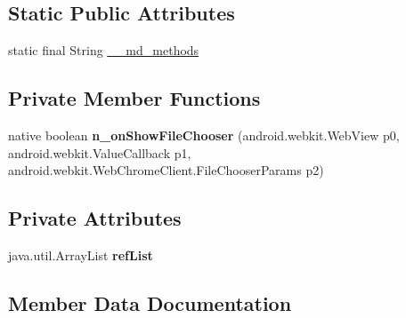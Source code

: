 \subsection*{Static Public Attributes}
\begin{DoxyCompactItemize}
\item 
static final String \hyperlink{classmd5b60ffeb829f638581ab2bb9b1a7f4f3f_1_1FormsWebChromeClient_acdbbbfa40f7a32b9cc6eaabbd04669e5}{\+\_\+\+\_\+md\+\_\+methods}
\end{DoxyCompactItemize}
\subsection*{Private Member Functions}
\begin{DoxyCompactItemize}
\item 
\mbox{\label{classmd5b60ffeb829f638581ab2bb9b1a7f4f3f_1_1FormsWebChromeClient_ad8f4fdd59e647809da2cedab336eac27}} 
native boolean {\bfseries n\+\_\+on\+Show\+File\+Chooser} (android.\+webkit.\+Web\+View p0, android.\+webkit.\+Value\+Callback p1, android.\+webkit.\+Web\+Chrome\+Client.\+File\+Chooser\+Params p2)
\end{DoxyCompactItemize}
\subsection*{Private Attributes}
\begin{DoxyCompactItemize}
\item 
\mbox{\label{classmd5b60ffeb829f638581ab2bb9b1a7f4f3f_1_1FormsWebChromeClient_a070f1a439df90e372bf765d09f0fb0be}} 
java.\+util.\+Array\+List {\bfseries ref\+List}
\end{DoxyCompactItemize}


\subsection{Member Data Documentation}
\mbox{\label{classmd5b60ffeb829f638581ab2bb9b1a7f4f3f_1_1FormsWebChromeClient_acdbbbfa40f7a32b9cc6eaabbd04669e5}} 
